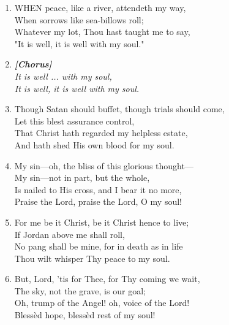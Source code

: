 \documentclass[11pt,a4paper]{article}
\begin{document}
\begin{enumerate}
    \item WHEN peace, like a river, attendeth my way, \\
        When sorrows like sea-billows roll; \\
        Whatever my lot, Thou hast taught me to say, \\
        "It is well, it is well with my soul."

    \item[] \vspace{0.4em}
    \textbf{\textit{[Chorus]}} \\
    \textit{It is well ... with my soul,} \\
    \textit{It is well, it is well with my soul.}
    \vspace{0.4em}

    \item Though Satan should buffet, though trials should come, \\
        Let this blest assurance control, \\
        That Christ hath regarded my helpless estate, \\
        And hath shed His own blood for my soul.

    \item My sin---oh, the bliss of this glorious thought--- \\
        My sin---not in part, but the whole, \\
        Is nailed to His cross, and I bear it no more, \\
        Praise the Lord, praise the Lord, O my soul!

    \item For me be it Christ, be it Christ hence to live; \\
        If Jordan above me shall roll, \\
        No pang shall be mine, for in death as in life \\
        Thou wilt whisper Thy peace to my soul.

    \item But, Lord, 'tis for Thee, for Thy coming we wait, \\
        The sky, not the grave, is our goal; \\
        Oh, trump of the Angel! oh, voice of the Lord! \\
        Bless\`ed hope, bless\`ed rest of my soul!

\end{enumerate}
\end{document}
